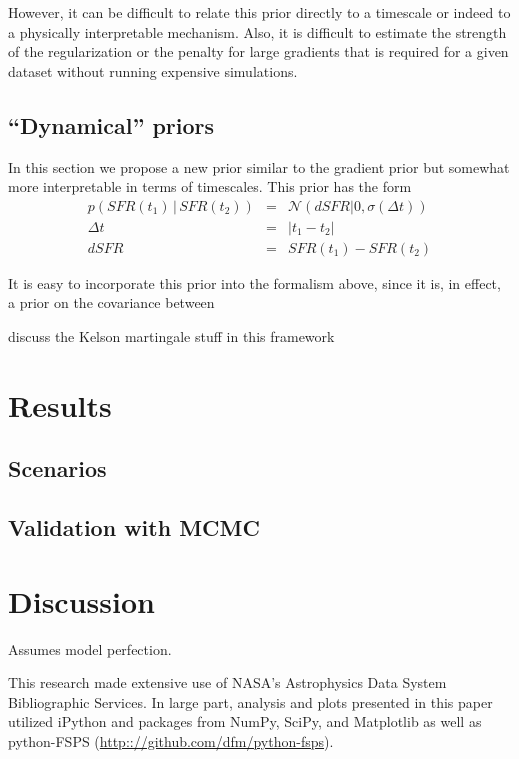 \documentclass[iop,numberedappendix]{emulateapj}
\newcommand{\given}{\,|\,}
\begin{document}
However, it can be difficult to relate this prior directly to a timescale or indeed to a physically interpretable mechanism.
Also, it is difficult to estimate the strength of the regularization or the penalty for large gradients that is required for a given dataset without running expensive simulations.


\subsection{``Dynamical'' priors}
In this section we propose a new prior similar to the gradient prior but somewhat more interpretable in terms of timescales.
This prior has the form
\begin{eqnarray}
p(SFR(t_1) \given SFR(t_2)) & = & \mathcal{N}(dSFR | 0, \sigma(\Delta t)) \\
\Delta t & = & | t_1 - t_2 | \\
dSFR & = & SFR(t_1) - SFR(t_2)
\end{eqnarray}

It is easy to incorporate this prior into the \crbound formalism above, since it is, in effect, a prior on the covariance between 

{\color{\blue} discuss the Kelson martingale stuff in this framework}

\section{Results}
\subsection{Scenarios}

\subsection{Validation with MCMC}

\section{Discussion}

Assumes model perfection.



\acknowledgements
This research made extensive use of NASA's Astrophysics Data System Bibliographic Services. 
In large part, analysis and plots presented in this paper utilized iPython and
packages from NumPy, SciPy, and Matplotlib \citep[][]{hunter2007, oliphant2007,
perez2007} as well as python-FSPS (\url{http:://github.com/dfm/python-fsps}).
\end{document}
